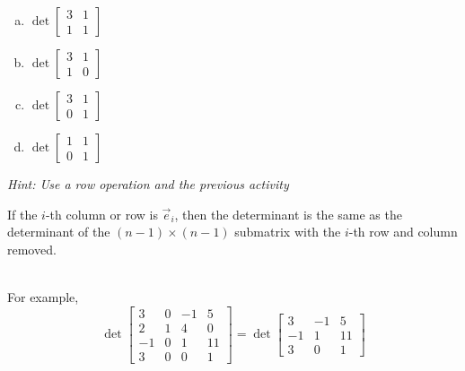 \begin{applicationActivities}{2}{26}
\begin{activity}{5}
\begin{multicols}{2}
\begin{enumerate}[(a)]
\item $\det \begin{bmatrix} 3 & 1 \\ 1 & 1 \end{bmatrix}$
\item $\det \begin{bmatrix} 3 & 1 \\ 1 & 0 \end{bmatrix}$
\item $\det \begin{bmatrix} 3 & 1 \\ 0 & 1 \end{bmatrix}$
\item $\det \begin{bmatrix} 1 & 1 \\ 0 & 1 \end{bmatrix}$
\end{enumerate}


\begin{center}
\end{center}
\end{multicols}

{\em Hint: Use a row operation and the previous activity}
\end{activity}

\begin{observation}
If the $i$-th column or row is $\vec{e}_i$, then the determinant is the same as the determinant of the $(n-1) \times (n-1)$ submatrix with the $i$-th row and column removed.

\ \\

For example, 
$$\det \begin{bmatrix} 3 & 0 & -1 & 5 \\ 2 & 1 & 4 & 0 \\ -1 & 0 & 1 & 11 \\ 3 & 0 & 0 & 1 \end{bmatrix} = \det \begin{bmatrix} 3 & -1 & 5 \\ -1 & 1 & 11 \\ 3 & 0 & 1 \end{bmatrix}$$
\end{observation}


\end{applicationActivities}
